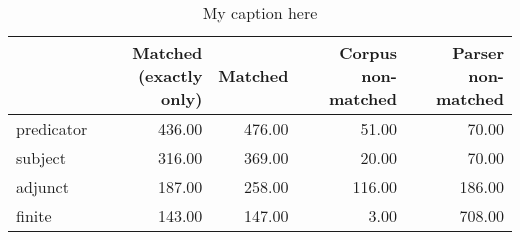 \begin{table}[!ht]
\centering
\begin{tabular}{lrrrr}
\toprule
{} &  Matched (exactly only) &  Matched &  Corpus non-matched &  Parser non-matched \\
\midrule
predicator &                  436.00 &   476.00 &               51.00 &               70.00 \\
subject    &                  316.00 &   369.00 &               20.00 &               70.00 \\
adjunct    &                  187.00 &   258.00 &              116.00 &              186.00 \\
finite     &                  143.00 &   147.00 &                3.00 &              708.00 \\
\bottomrule
\end{tabular}
\caption{My caption here}
\label{tab:unit-elements-mood-data}
\end{table}
